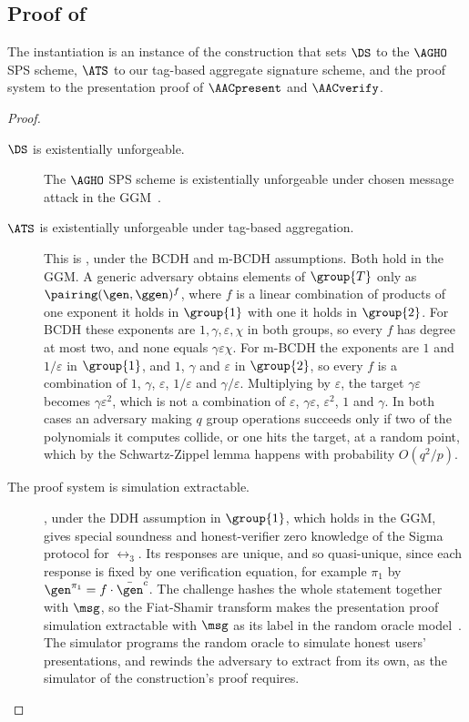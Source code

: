 \subsection{Proof of }\label{sec:agg-creds-proof-3}

The instantiation is an instance of the construction that sets $\DS$ to the
$\AGHO$ SPS scheme, $\ATS$ to our tag-based aggregate signature scheme, and the
proof system to the presentation proof of $\AACpresent$ and $\AACverify$.

\begin{proof}

  \begin{description}

        \item[$\DS$ is existentially unforgeable.] The $\AGHO$ SPS scheme is existentially
unforgeable under chosen message attack in the GGM~\cite{C:AGHO11}.

    \item[$\ATS$ is existentially unforgeable under tag-based aggregation.] This
is , under the BCDH and m-BCDH assumptions. Both hold
in the GGM. A generic adversary obtains elements of $\group{T}$ only as
$\pairing(\gen, \ggen)^{f}$, where $f$ is a linear combination of products of
one exponent it holds in $\group{1}$ with one it holds in $\group{2}$. For BCDH
these exponents are $1, \gamma, \varepsilon, \chi$ in both groups, so every $f$
has degree at most two, and none equals $\gamma\varepsilon\chi$. For m-BCDH the
exponents are $1$ and $1/\varepsilon$ in $\group{1}$, and $1$, $\gamma$ and
$\varepsilon$ in $\group{2}$, so every $f$ is a combination of $1$, $\gamma$,
$\varepsilon$, $1/\varepsilon$ and $\gamma/\varepsilon$. Multiplying by
$\varepsilon$, the target $\gamma\varepsilon$ becomes $\gamma\varepsilon^2$,
which is not a combination of $\varepsilon$, $\gamma\varepsilon$,
$\varepsilon^2$, $1$ and $\gamma$. In both cases an adversary making $q$ group
operations succeeds only if two of the polynomials it computes collide, or one
hits the target, at a random point, which by the Schwartz-Zippel lemma happens
with probability $O(q^2/p)$.

    \item[The proof system is simulation extractable.] ,
under the DDH assumption in $\group{1}$, which holds in the GGM, gives special
soundness and honest-verifier zero knowledge of the Sigma protocol for $\rel_3$.
Its responses are unique, and so quasi-unique, since each response is fixed by
one verification equation, for example $\pi_1$ by $\gen^{\pi_1} = f \cdot
\bar{\gen}^c$. The challenge hashes the whole statement together with $\msg$, so
the Fiat-Shamir transform makes the presentation proof simulation extractable
with $\msg$ as its label in the random oracle model~\cite{INDOCRYPT:FKMV12}. The
simulator programs the random oracle to simulate honest users' presentations,
and rewinds the adversary to extract from its own, as the simulator
of the construction's proof requires.


\end{description}
\end{proof}
